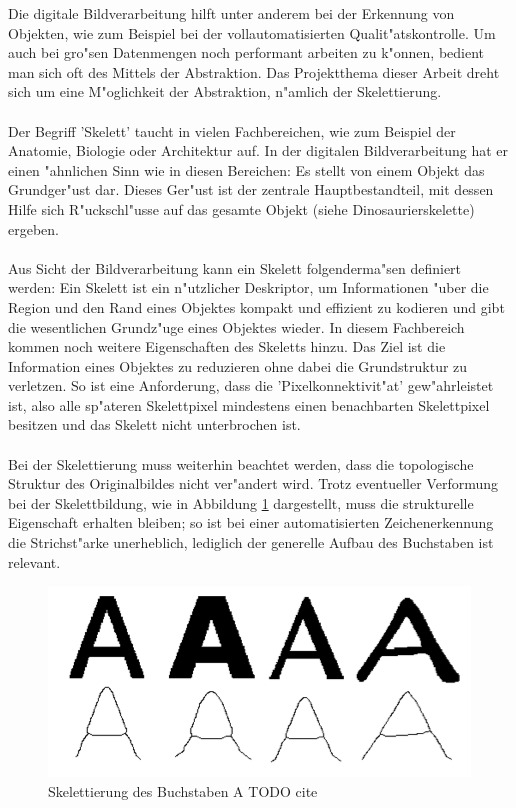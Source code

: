 Die digitale Bildverarbeitung hilft unter anderem bei der Erkennung von Objekten, wie zum Beispiel bei der vollautomatisierten Qualit"atskontrolle. Um auch bei gro"sen Datenmengen noch performant arbeiten zu k"onnen, bedient man sich oft des Mittels der Abstraktion. Das Projektthema dieser Arbeit dreht sich um eine M"oglichkeit der Abstraktion, n"amlich der Skelettierung. \\ \\
Der Begriff 'Skelett' taucht in vielen Fachbereichen, wie zum Beispiel der Anatomie, Biologie oder Architektur auf. In der digitalen Bildverarbeitung hat er einen "ahnlichen Sinn wie in diesen Bereichen: Es stellt von einem Objekt das Grundger"ust dar. Dieses Ger"ust ist der zentrale Hauptbestandteil, mit dessen Hilfe sich R"uckschl"usse auf das gesamte Objekt (siehe Dinosaurierskelette) ergeben. \\ \\
Aus Sicht der Bildverarbeitung kann ein Skelett folgenderma"sen definiert werden: Ein Skelett ist ein n"utzlicher Deskriptor, um Informationen "uber die Region und den Rand eines Objektes kompakt und effizient zu kodieren und gibt die wesentlichen Grundz"uge eines Objektes wieder. In diesem Fachbereich kommen noch weitere Eigenschaften des Skeletts hinzu. Das Ziel ist die Information eines Objektes zu reduzieren ohne dabei die Grundstruktur zu verletzen. So ist eine Anforderung, dass die 'Pixelkonnektivit"at' gew"ahrleistet ist, also alle sp"ateren Skelettpixel mindestens einen benachbarten Skelettpixel besitzen und das Skelett nicht unterbrochen ist. \\ \\
Bei der Skelettierung muss weiterhin beachtet werden, dass die topologische Struktur des Originalbildes nicht ver"andert wird. Trotz eventueller Verformung bei der Skelettbildung, wie in Abbildung \ref{fig:topologischeStruktur} dargestellt, muss die strukturelle Eigenschaft erhalten bleiben; so ist bei einer automatisierten Zeichenerkennung die Strichst"arke unerheblich, lediglich der generelle Aufbau des Buchstaben ist relevant. \\
\begin{figure}
\centering
\includegraphics[width=0.7\linewidth]{./fig/topologischeStruktur}
\caption{Skelettierung des Buchstaben A TODO cite \cite{buhlmann}}
\label{fig:topologischeStruktur}
\end{figure}


